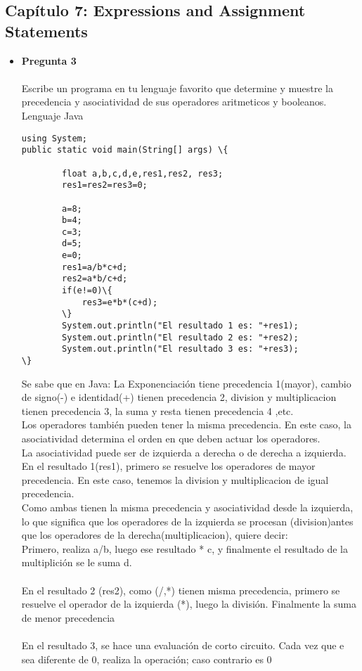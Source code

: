 \documentclass[12pt,oneside]{article}
\begin{document}
\subsection{Capítulo 7: Expressions and Assignment Statements}
\begin{itemize}
\item {\bf Pregunta 3} \\\\
Escribe un programa en tu lenguaje favorito que determine y muestre la precedencia y asociatividad de sus operadores aritmeticos y booleanos.\\
Lenguaje Java\\
\begin{lstlisting}[frame=single]  % Start your code-block
using System;
public static void main(String[] args) \{
        
        float a,b,c,d,e,res1,res2, res3;
        res1=res2=res3=0;
        
        a=8;
        b=4;
        c=3;
        d=5;
        e=0;
        res1=a/b*c+d;
        res2=a*b/c+d;
        if(e!=0)\{
            res3=e*b*(c+d);
        \}
        System.out.println("El resultado 1 es: "+res1);
        System.out.println("El resultado 2 es: "+res2);
        System.out.println("El resultado 3 es: "+res3);
\}

\end{lstlisting}

Se sabe que en Java: La Exponenciación tiene precedencia 1(mayor), cambio de signo(-) e identidad(+) tienen precedencia 2, division y multiplicacion tienen precedencia 3, la suma y resta tienen precedencia 4 ,etc.\\
Los operadores también pueden tener la misma precedencia. En este caso, la asociatividad determina el orden en que deben actuar los operadores. \\
La asociatividad puede ser de izquierda a derecha o de derecha a izquierda.\\
En el resultado 1(res1), primero se resuelve los operadores de mayor precedencia. En este caso, tenemos la division y multiplicacion de igual precedencia.\\
Como ambas tienen la misma precedencia y asociatividad desde la izquierda, lo que significa que los operadores de la izquierda se procesan (division)antes que los operadores de la derecha(multiplicacion), quiere decir:\\
Primero, realiza a/b, luego ese resultado * c, y finalmente el resultado de la multiplición se le suma d. \\\\
En el resultado 2 (res2), como (/,*) tienen misma precedencia, primero se resuelve el operador de la izquierda (*), luego la división. Finalmente la suma de menor precedencia\\\\
En el resultado 3, se hace una evaluación de corto circuito. Cada vez que e sea diferente de 0, realiza la operación; caso contrario es 0\\\\\\


\end{itemize}
\end{document}
